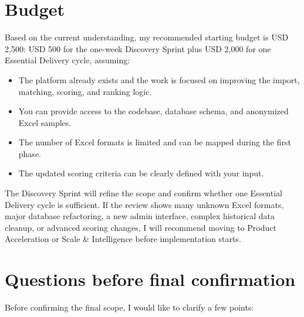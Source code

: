 \documentclass[11pt,a4paper]{article}
\begin{document}
\section*{Budget}

Based on the current understanding, my recommended starting budget is USD 2,500: USD 500 for the one-week Discovery Sprint plus USD 2,000 for one Essential Delivery cycle, assuming:\par

\begin{itemize}
\item The platform already exists and the work is focused on improving the import, matching, scoring, and ranking logic.
\item You can provide access to the codebase, database schema, and anonymized Excel samples.
\item The number of Excel formats is limited and can be mapped during the first phase.
\item The updated scoring criteria can be clearly defined with your input.
\end{itemize}

The Discovery Sprint will refine the scope and confirm whether one Essential Delivery cycle is sufficient. If the review shows many unknown Excel formats, major database refactoring, a new admin interface, complex historical data cleanup, or advanced scoring changes, I will recommend moving to Product Acceleration or Scale \& Intelligence before implementation starts.\par

\section*{Questions before final confirmation}

Before confirming the final scope, I would like to clarify a few points:\par
\end{document}

